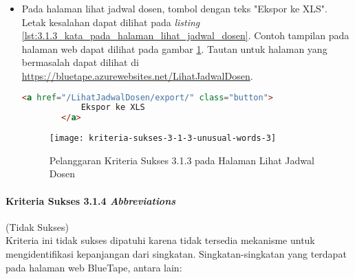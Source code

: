 \begin{itemize}
    \item Pada halaman lihat jadwal dosen, tombol dengan teks "Ekspor ke XLS". Letak kesalahan dapat dilihat pada \textit{listing} \ref{lst:3.1.3_kata_pada_halaman_lihat_jadwal_dosen}. Contoh tampilan pada halaman web dapat dilihat pada gambar \ref{fig:3.1.3_unusual_words_3}. Tautan untuk halaman yang bermasalah dapat dilihat di \url{https://bluetape.azurewebsites.net/LihatJadwalDosen}.
    \begin{lstlisting}[frame=single, label={lst:3.1.3_kata_pada_halaman_lihat_jadwal_dosen}, language=HTML, caption=Pelanggaran Kriteria Sukses 3.1.3 pada Halaman Lihat Jadwal Dosen]
        <a href="/LihatJadwalDosen/export/" class="button">
            Ekspor ke XLS
        </a>
    \end{lstlisting}
    
    \begin{figure}[H]
        \centering  
        \texttt{[image: kriteria-sukses-3-1-3-unusual-words-3]}  
        \caption[Pelanggaran Kriteria Sukses 3.1.3 pada Halaman Lihat Jadwal Dosen]{Pelanggaran Kriteria Sukses 3.1.3 pada Halaman Lihat Jadwal Dosen}
        \label{fig:3.1.3_unusual_words_3}  
    \end{figure}
    
\end{itemize}

\paragraph{Kriteria Sukses 3.1.4 \textit{Abbreviations}}
\label{par:kepatuhan_bluetape_kriteria_sukses_3.1.4}
(Tidak Sukses)\\

Kriteria ini tidak sukses dipatuhi karena tidak tersedia mekanisme untuk mengidentifikasi kepanjangan dari singkatan. Singkatan-singkatan yang terdapat pada halaman web BlueTape, antara lain:

